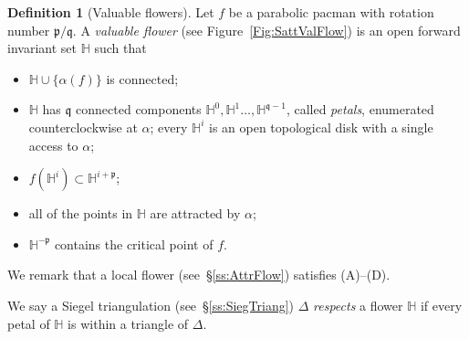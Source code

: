 \documentclass[]{amsart}
\newcommand{\bDelta}{{\mathbb{\Delta}}}
\newcommand{\fH}{{\mathbb H}}
\newcommand{\pp}{\mathfrak{p}}
\renewcommand{\qq}{\mathfrak{q}}
\theoremstyle{remark}
\numberwithin{equation}{section}
\theoremstyle{definition}
\newtheorem{defn}[thm]{Definition}
\begin{document}
\begin{defn}[Valuable flowers]
\label{dfn:ParValFlow}
Let $f$ be a parabolic pacman with rotation number $\pp/\qq$.
 A \emph{valuable  flower} (see Figure~\ref{Fig:SattValFlow}) is an open forward invariant set $\fH$ such that
\begin{itemize}
\item[(A)] $\fH\cup \{\alpha(f)\}$ is connected;
\item[(B)] $\fH$ has $\qq$ connected components $\fH^{0}, \fH^{1}\dots ,\fH^{\qq-1}$, called \emph{petals}, enumerated counterclockwise at $\alpha$; every $\fH^{i}$ is an open topological disk with a single access to $\alpha$;
\item[(C)] $f(\fH^{i})\subset \fH^{i + \pp}$;
\item[(D)] all of the points in $\fH$ are attracted by $\alpha$;
\item[(E)] $\fH^{-\pp}$ contains the critical point of $f$.
\end{itemize}
\end{defn}
\noindent We remark that a local flower (see~\S\ref{ss:AttrFlow}) satisfies (A)--(D). 



We say a Siegel triangulation (see~\S\ref{ss:SiegTriang}) $\bDelta$ \emph{respects} a flower $\fH$ if every petal of $\fH$ is within a triangle of $\bDelta$.
\end{document}
